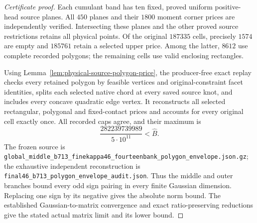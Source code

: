 \begin{proof}[Certificate proof]
Each cumulant band has ten fixed, proved uniform positive-head source
planes. All $450$ planes and their $1800$ moment corner prices are
independently verified. Intersecting these planes and the other proved
source restrictions retains all physical points. Of the original
$187335$ cells, precisely $1574$ are empty and $185761$ retain a selected
upper price. Among the latter, $8612$ use complete recorded polygons;
the remaining cells use valid enclosing rectangles.

Using Lemma~\ref{lem:physical-source-polygon-price}, the producer-free
exact replay checks every retained polygon by feasible
vertices and original-constraint facet identities, splits each selected
native chord at every saved source knot, and includes every concave
quadratic edge vertex. It reconstructs all selected rectangular,
polygonal and fixed-contact prices and accounts for every original cell
exactly once. All recorded caps agree, and their maximum is
\[
 \frac{282239739989}{5\cdot10^{11}}<\widehat B.
\]
The frozen source is
\texttt{global\_\allowbreak middle\_\allowbreak b713\_\allowbreak finekappa46\_\allowbreak fourteenbank\_\allowbreak polygon\_\allowbreak envelope.json.gz};
the exhaustive independent reconstruction is
\texttt{final46\_\allowbreak b713\_\allowbreak polygon\_\allowbreak envelope\_\allowbreak audit.json}.
Thus the middle and outer branches bound every odd sign pairing in
every finite Gaussian dimension. Replacing one sign by its negative
gives the absolute norm bound. The established Gaussian-to-matrix
convergence and exact ratio-preserving reductions give the stated
actual matrix limit and its lower bound.
\end{proof}
